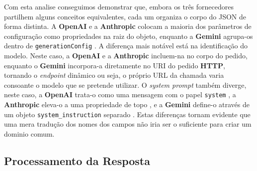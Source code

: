 Com esta analise conseguimos demonstrar que, embora os três fornecedores partilhem alguns conceitos equivalentes, cada um organiza o corpo do JSON de forma distinta. A \textbf{OpenAI} \cite{openai_api} e a \textbf{Anthropic} \cite{anthropic_api} colocam a maioria dos parâmetros de configuração como propriedades na raiz do objeto, enquanto a \textbf{Gemini} agrupa-os dentro de \texttt{generationConfig} \cite{google_gemini_api}. A diferença mais notável está na identificação do modelo. Neste caso, a \textbf{OpenAI} e a \textbf{Anthropic} incluem-na no corpo do pedido, enquanto o \textbf{Gemini} incorpora-a diretamente no URI do pedido \textbf{HTTP}, tornando o \textit{endpoint} dinâmico ou seja, o próprio URL da chamada varia consoante o modelo que se pretende utilizar. O \textit{system prompt} também diverge, neste caso, a \textbf{OpenAI} trata-o como uma mensagem com o papel \texttt{system} \cite{openai_api}, a \textbf{Anthropic} eleva-o a uma propriedade de topo \cite{anthropic_api}, e a \textbf{Gemini} define-o através de um objeto \texttt{system\_instruction} separado \cite{google_gemini_api}. Estas diferenças tornam evidente que uma mera tradução dos nomes dos campos não iria ser o suficiente para criar um dominio comum. 

\subsection{Processamento da Resposta}

